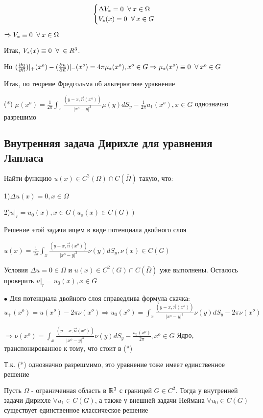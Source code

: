 \begin{equation}
 \begin{cases}
 \Delta V_* = 0 \;\;\forall\: x \in \Omega
  \\
  V_*(x) = 0 \;\;\forall\: x \in G
 \end{cases}
\end{equation}

$\Rightarrow V_* \equiv 0 \;\;\forall\: x \in \Omega$

Итак, $V_*(x) \equiv 0 \;\;\forall\: \in R^3$. 

Но $(\frac{\partial u}{\partial \vec{n}})|_+(x^o) - (\frac{\partial u}{\partial \vec{n}})|_-(x^o) = 4\pi \mu_*(x^o), x^o \in G \Rightarrow \mu_*(x^o) \equiv 0 \;\;\forall\: x^o \in G$

Итак, по теореме Фредгольма об альтернативе уравнение 

(*) $\mu(x^o) = \frac{1}{2\pi}\int_x \frac{(y - x, \vec{n}(x^o))}{|x^o - y|^3}\mu(y)dS_y - \frac{1}{2\pi}u_1(x^o), x \in G$ однозначно разрешимо

\subsection{Внутренняя задача Дирихле для уравнения Лапласа}

Найти функцию $u(x) \in C^2(\Omega) \cap C(\bar{\Omega})$ такую, что:

1)$\Delta u(x) = 0, x \in \Omega$

2)$u|_r = u_0(x), x \in G (u_o(x) \in C(G))$ 

Решение этой задачи ищем в виде потенциала двойного слоя 

$u(x) = \frac{1}{2\pi}\int_x \frac{(y - x, \vec{n}(x^o))}{|x^o - y|^3}\nu(y)dS_y, \nu(x) \in C(G)$

Условия $\Delta u = 0 \in \Omega$ и $u(x) \in C^2(G) \cap C(\bar{\Omega})$ уже выполнены. Осталось проверить $u|_r = u_0(x), x \in G$

$\bullet$ Для потенциала двойного слоя справедлива формула скачка: $u_+(x^o) = u(x^o) - 2\pi\nu(x^o) \Rightarrow u_0(x^o) = \int_x \frac{(y - x, \vec{n}(x^o))}{|x^o - y|^3}\nu(y)dS_y - 2\pi\nu(x^o)$

$\Rightarrow \nu(x^o) = \int_x \frac{(y - x, \vec{n}(x^o))}{|x^o - y|^3}\nu(y)dS_y - \frac{u_0(x^o)}{2\pi}, x^o \in G$ Ядро, транспонированное к тому, что стоит в (*) 

Т.к. (*) однозначно разрешмимо, это уравнение тоже имеет единственное решение

\begin{theorem} Пусть $\Omega$ - ограниченная область в $\mathbb{R}^3$ с границей $G \in C^2$. Тогда у внутренней задачи Дирихле $\forall u_1 \in C(G)$, а также у внешней задачи Неймана $\forall u_0 \in C(G)$ существует единственное классическое решение
\end{theorem} 



